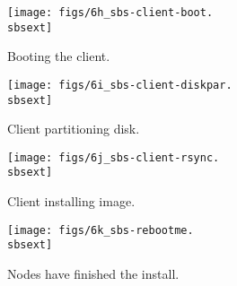 \setlength{\oddsidemargin}{-0.5in}
\setlength{\evensidemargin}{-0.5in}
\setlength{\textwidth}{7.5in}

\begin{figure}[htbp]
  \begin{center}
    \texttt{[image: figs/6h\_sbs-client-boot.\\sbsext]}
    \caption{Booting the client.}
    \label{fig:sbs-install-boot}
  \end{center}
\end{figure}


\begin{figure}[htbp]
  \begin{center}
    \texttt{[image: figs/6i\_sbs-client-diskpar.\\sbsext]}
    \caption{Client partitioning disk.}
    \label{fig:sbs-install-diskpar}
  \end{center}
\end{figure}

\begin{figure}[htbp]
  \begin{center}
    \texttt{[image: figs/6j\_sbs-client-rsync.\\sbsext]}
    \caption{Client installing image.}
    \label{fig:sbs-install-rsync}
  \end{center}
\end{figure}

\begin{figure}[htbp]
  \begin{center}
    \texttt{[image: figs/6k\_sbs-rebootme.\\sbsext]}
    \caption{Nodes have finished the install.}
    \label{fig:sbs-install-finish}
  \end{center}
\end{figure}

